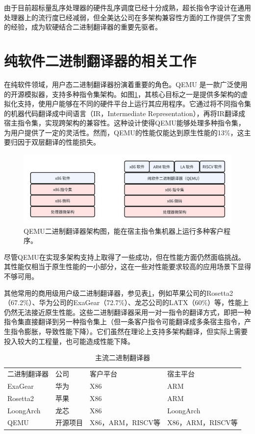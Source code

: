 由于目前超标量乱序处理器的硬件乱序调度已经十分成熟，超长指令字设计在通用处理器上的流行度已经减弱，但全美达公司在多架构兼容性方面的工作提供了宝贵的经验，成为软硬结合二进制翻译器的重要先驱者。

\section{纯软件二进制翻译器的相关工作}

在纯软件领域，用户态二进制翻译器扮演着重要的角色。QEMU 是一款广泛使用的开源模拟器，支持多种指令集架构。如图\ref{img:qemu_arch}，其核心目标之一是提供多架构的虚拟化支持，使用户能够在不同的硬件平台上运行其应用程序。它通过将不同指令集的机器代码翻译成中间语言（IR，Intermediate Representation），再将IR翻译成宿主指令集，实现跨架构的兼容性。这种设计使得QEMU能够处理多种指令集，为用户提供了一定的灵活性。然而，QEMU的性能仅能达到原生性能的13\%，这主要归因于双层翻译的性能损失。

\begin{figure}[h]
  \centering
  \includegraphics[width=0.8\linewidth]{./feishuImage/qemu_arch.png}
  \caption{QEMU二进制翻译器架构图，能在宿主指令集机器上运行多种客户程序。}
  \label{img:qemu_arch}
\end{figure}

尽管QEMU在实现多架构支持上取得了一些成功，但在性能方面仍然面临挑战。其性能仅相当于原生性能的一小部分，这在一些对性能要求较高的应用场景下显得不够可用。

其他常用的商用级用户级二进制翻译器，参见表\ref{tab:BTs}，例如苹果公司的Rosetta2（67.2\%）、华为公司的ExaGear（72.7\%）、龙芯公司的LATX（60\%）等，性能上仍然无法接近原生性能。这些二进制翻译器采用一对一指令的翻译方式，即把一种指令集直接翻译到另一种指令集上（但一条客户指令可能翻译成多条宿主指令，产生指令膨胀，导致性能下降）。它们虽然在理论上支持多架构翻译，但实际上需要投入较大的工程量，也可能造成性能下降。

\begin{table}[]
\centering
\caption{主流二进制翻译器}
\label{tab:BTs}
  \begin{tabular}{llll}
  \rowcolor[HTML]{FBE5D6} 
  二进制翻译器    & 公司   & 客户平台           & 宿主平台           \\
  ExaGear   & 华为   & X86            & ARM            \\
  Rosetta2  & 苹果   & X86            & ARM            \\
  LoongArch & 龙芯   & X86            & LoongArch      \\
  QEMU      & 开源项目 & X86，ARM，RISCV等 & X86，ARM，RISCV等
  \end{tabular}
  \end{table}

